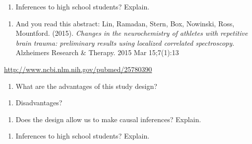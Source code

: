 \documentclass[
]{report}
\providecommand{\tightlist}{%
  \setlength{\itemsep}{0pt}\setlength{\parskip}{0pt}}
\begin{document}
\begin{enumerate}
\def\labelenumi{(\alph{enumi})}
\setcounter{enumi}{3}
\tightlist
\item
  Inferences to high school students? Explain.
\end{enumerate}

\vspace{0.5in}

\begin{enumerate}
\def\labelenumi{\arabic{enumi}.}
\setcounter{enumi}{3}
\tightlist
\item
  And you read this abstract:
  Lin, Ramadan, Stern, Box, Nowinski, Ross, Mountford. (2015). \emph{Changes in the neurochemistry of athletes with repetitive brain trauma: preliminary results using localized correlated spectroscopy.} Alzheimers Research \& Therapy.
  2015 Mar 15;7(1):13
\end{enumerate}

\url{http://www.ncbi.nlm.nih.gov/pubmed/25780390}

\begin{enumerate}
\def\labelenumi{(\alph{enumi})}
\tightlist
\item
  What are the advantages of this study design?
\end{enumerate}

\vspace{0.5in}

\begin{enumerate}
\def\labelenumi{(\alph{enumi})}
\setcounter{enumi}{1}
\tightlist
\item
  Disadvantages?
\end{enumerate}

\vspace{0.5in}

\begin{enumerate}
\def\labelenumi{(\alph{enumi})}
\setcounter{enumi}{2}
\tightlist
\item
  Does the design allow us to make causal inferences? Explain.
\end{enumerate}

\vspace{0.5in}

\begin{enumerate}
\def\labelenumi{(\alph{enumi})}
\setcounter{enumi}{3}
\tightlist
\item
  Inferences to high school students? Explain.
\end{enumerate}

\vspace{0.5in}
\end{document}
